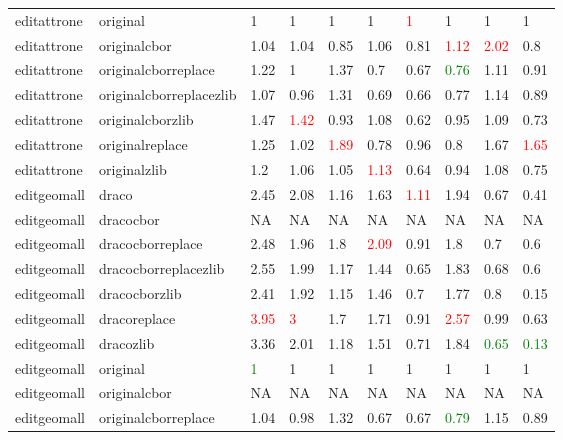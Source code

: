 \begin{landscape}
\begin{longtable}{llllllllll}
editattrone & original & 1 & 1 & 1 & 1 & \textcolor{red}{1} & 1 & 1 & 1\\
editattrone & originalcbor & 1.04 & 1.04 & 0.85 & 1.06 & 0.81 & \textcolor{red}{1.12} & \textcolor{red}{2.02} & 0.8\\
editattrone & originalcborreplace & 1.22 & 1 & 1.37 & 0.7 & 0.67 & \textcolor{green}{0.76} & 1.11 & 0.91\\
\rowcolor{lightgray}  editattrone & originalcborreplacezlib & 1.07 & 0.96 & 1.31 & 0.69 & 0.66 & 0.77 & 1.14 & 0.89\\
\rowcolor{lightgray}  editattrone & originalcborzlib & 1.47 & \textcolor{red}{1.42} & 0.93 & 1.08 & 0.62 & 0.95 & 1.09 & 0.73\\
\rowcolor{lightgray}  editattrone & originalreplace & 1.25 & 1.02 & \textcolor{red}{1.89} & 0.78 & 0.96 & 0.8 & 1.67 & \textcolor{red}{1.65}\\
\rowcolor{lightgray}  editattrone & originalzlib & 1.2 & 1.06 & 1.05 & \textcolor{red}{1.13} & 0.64 & 0.94 & 1.08 & 0.75\\
\rowcolor{lightgray}  editgeomall & draco & 2.45 & 2.08 & 1.16 & 1.63 & \textcolor{red}{1.11} & 1.94 & 0.67 & 0.41\\
\rowcolor{lightgray}  editgeomall & dracocbor & NA & NA & NA & NA & NA & NA & NA & NA\\
\rowcolor{lightgray}  editgeomall & dracocborreplace & 2.48 & 1.96 & 1.8 & \textcolor{red}{2.09} & 0.91 & 1.8 & 0.7 & 0.6\\
\rowcolor{lightgray}  editgeomall & dracocborreplacezlib & 2.55 & 1.99 & 1.17 & 1.44 & 0.65 & 1.83 & 0.68 & 0.6\\
\rowcolor{lightgray}  editgeomall & dracocborzlib & 2.41 & 1.92 & 1.15 & 1.46 & 0.7 & 1.77 & 0.8 & 0.15\\
\rowcolor{lightgray}  editgeomall & dracoreplace & \textcolor{red}{3.95} & \textcolor{red}{3} & 1.7 & 1.71 & 0.91 & \textcolor{red}{2.57} & 0.99 & 0.63\\
\rowcolor{lightgray}  editgeomall & dracozlib & 3.36 & 2.01 & 1.18 & 1.51 & 0.71 & 1.84 & \textcolor{green}{0.65} & \textcolor{green}{0.13}\\
\rowcolor{lightgray}  editgeomall & original & \textcolor{green}{1} & 1 & 1 & 1 & 1 & 1 & 1 & 1\\
\rowcolor{lightgray}  editgeomall & originalcbor & NA & NA & NA & NA & NA & NA & NA & NA\\
editgeomall & originalcborreplace & 1.04 & 0.98 & 1.32 & 0.67 & 0.67 & \textcolor{green}{0.79} & 1.15 & 0.89\\

\end{longtable}
\end{landscape}
